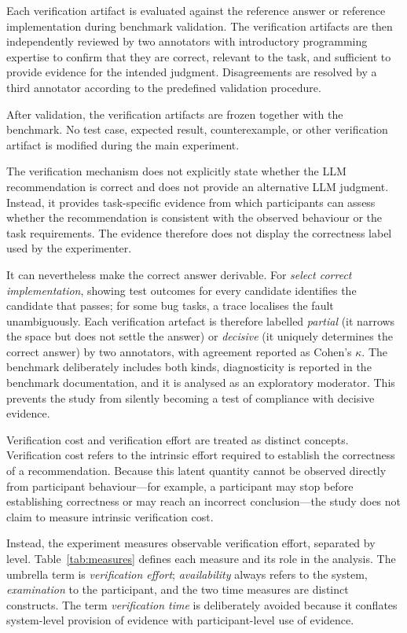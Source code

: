 \documentclass[oneside,final,14pt,a4paper]{extreport}
\begin{document}
Each verification artifact is evaluated against the reference answer or 
reference implementation during benchmark validation. The verification 
artifacts are then independently reviewed by two annotators with introductory 
programming expertise to confirm that they are correct, relevant to the task, 
and sufficient to provide evidence for the intended judgment. Disagreements 
are resolved by a third annotator according to the predefined validation 
procedure.

After validation, the verification artifacts are frozen together with the 
benchmark. No test case, expected result, counterexample, or other verification 
artifact is modified during the main experiment.

The verification mechanism does not explicitly state whether the LLM recommendation 
is correct and does not provide an alternative LLM judgment. Instead, 
it provides task-specific evidence from which participants can assess 
whether the recommendation is consistent with the observed behaviour 
or the task requirements. The evidence therefore does not display the
correctness label used by the experimenter.

It can nevertheless make the correct answer derivable. For
\emph{select correct implementation}, showing test outcomes for every
candidate identifies the candidate that passes; for some bug tasks, a trace
localises the fault unambiguously. Each verification artefact is therefore
labelled \emph{partial} (it narrows the space but does not settle the answer)
or \emph{decisive} (it uniquely determines the correct answer) by two
annotators, with agreement reported as Cohen's $\kappa$. The benchmark
deliberately includes both kinds, diagnosticity is reported in the benchmark
documentation, and it is analysed as an exploratory moderator. This prevents
the study from silently becoming a test of compliance with decisive evidence.

Verification cost and verification effort are treated as distinct concepts. 
Verification cost refers to the intrinsic effort required to establish the 
correctness of a recommendation. Because this latent quantity cannot be observed 
directly from participant behaviour---for example, a participant may stop 
before establishing correctness or may reach an incorrect conclusion---the 
study does not claim to measure intrinsic verification cost.

Instead, the experiment measures observable verification effort, separated by
level. Table~\ref{tab:measures} defines each measure and its role in the
analysis. The umbrella term is \emph{verification effort}; \emph{availability}
always refers to the system, \emph{examination} to the participant, and the
two time measures are distinct constructs. The term \emph{verification time}
is deliberately avoided because it conflates system-level provision of
evidence with participant-level use of evidence.
\end{document}
